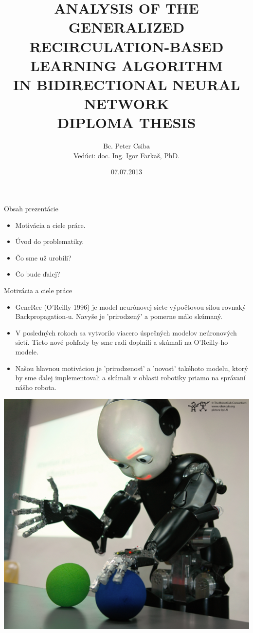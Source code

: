 \documentclass[xcolor=dvipsnames]{beamer}
\title[GeneRec Analysis]{
ANALYSIS OF THE GENERALIZED \\
RECIRCULATION-BASED LEARNING ALGORITHM \\
IN BIDIRECTIONAL NEURAL NETWORK \\
\vspace{3cm}
DIPLOMA THESIS
}
\author[P. Csiba]{Bc. Peter Csiba \\ Vedúci: doc. Ing. Igor Farkaš, PhD.}
\institute[FMFI UK]{
  UNIVERZITA KOMENSKÉHO V BRATISLAVE\\
  FAKULTA MATEMATIKY, FYZIKY A INFORMATIKY
}
\date{07.07.2013}
\begin{document}
\begin{frame}[plain]
  \titlepage
\end{frame}

\begin{frame}{Obsah prezentácie}
  \begin{itemize}
  \item Motivácia a ciele práce.  
  \item Úvod do problematiky. 
  \item Čo sme už urobili? 
  \item Čo bude ďalej?  
  \end{itemize} 
\end{frame}

\begin{frame}{Motivácia a ciele práce}
  \begin{itemize}
  \item GeneRec (O'Reilly 1996) je model neurónovej siete výpočtovou silou rovnaký Backpropagation-u. Navyše je 'prirodzený' 
  a pomerne málo skúmaný.   
  \item V posledných rokoch sa vytvorilo viacero úspešných modelov neúronových sietí. Tieto nové pohľady by sme radi doplnili a skúmali na O'Reilly-ho modele. 
  \item Našou hlavnou motiváciou je 'prirodzenosť' a 'novosť' takéhoto modelu, ktorý by sme ďalej implementovali a skúmali v oblasti robotiky priamo na správaní nášho robota. 
  \end{itemize}
  \begin{center}
  \includegraphics{img/icub.png}
  \end{center} 
\end{frame}
\end{document}
